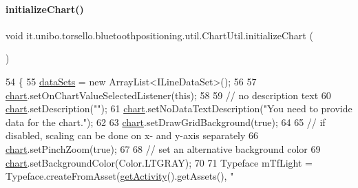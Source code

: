 \paragraph{\texorpdfstring{initialize\+Chart()}{initializeChart()}}
{\footnotesize\ttfamily void it.\+unibo.\+torsello.\+bluetoothpositioning.\+util.\+Chart\+Util.\+initialize\+Chart (\begin{DoxyParamCaption}{ }\end{DoxyParamCaption})}


\begin{DoxyCode}
54                                   \{
55         \hyperlink{classit_1_1unibo_1_1torsello_1_1bluetoothpositioning_1_1util_1_1ChartUtil_aa98bcaa2d5ba444b91cdc029768d380a_aa98bcaa2d5ba444b91cdc029768d380a}{dataSets} = \textcolor{keyword}{new} ArrayList<ILineDataSet>();
56 
57         \hyperlink{classit_1_1unibo_1_1torsello_1_1bluetoothpositioning_1_1util_1_1ChartUtil_a6c34176fdfb85bac1d3aa1529b49ad5f_a6c34176fdfb85bac1d3aa1529b49ad5f}{chart}.setOnChartValueSelectedListener(\textcolor{keyword}{this});
58 
59         \textcolor{comment}{// no description text}
60         \hyperlink{classit_1_1unibo_1_1torsello_1_1bluetoothpositioning_1_1util_1_1ChartUtil_a6c34176fdfb85bac1d3aa1529b49ad5f_a6c34176fdfb85bac1d3aa1529b49ad5f}{chart}.setDescription(\textcolor{stringliteral}{""});
61         \hyperlink{classit_1_1unibo_1_1torsello_1_1bluetoothpositioning_1_1util_1_1ChartUtil_a6c34176fdfb85bac1d3aa1529b49ad5f_a6c34176fdfb85bac1d3aa1529b49ad5f}{chart}.setNoDataTextDescription(\textcolor{stringliteral}{"You need to provide data for the chart."});
62 
63         \hyperlink{classit_1_1unibo_1_1torsello_1_1bluetoothpositioning_1_1util_1_1ChartUtil_a6c34176fdfb85bac1d3aa1529b49ad5f_a6c34176fdfb85bac1d3aa1529b49ad5f}{chart}.setDrawGridBackground(\textcolor{keyword}{true});
64 
65         \textcolor{comment}{// if disabled, scaling can be done on x- and y-axis separately}
66         \hyperlink{classit_1_1unibo_1_1torsello_1_1bluetoothpositioning_1_1util_1_1ChartUtil_a6c34176fdfb85bac1d3aa1529b49ad5f_a6c34176fdfb85bac1d3aa1529b49ad5f}{chart}.setPinchZoom(\textcolor{keyword}{true});
67 
68         \textcolor{comment}{// set an alternative background color}
69         \hyperlink{classit_1_1unibo_1_1torsello_1_1bluetoothpositioning_1_1util_1_1ChartUtil_a6c34176fdfb85bac1d3aa1529b49ad5f_a6c34176fdfb85bac1d3aa1529b49ad5f}{chart}.setBackgroundColor(Color.LTGRAY);
70 
71         Typeface mTfLight = Typeface.createFromAsset(\hyperlink{classit_1_1unibo_1_1torsello_1_1bluetoothpositioning_1_1util_1_1ChartUtil_a59150a6d20b6d0ad2fcf8c1ba858d355_a59150a6d20b6d0ad2fcf8c1ba858d355}{getActivity}().getAssets(), \textcolor{stringliteral}{"
}
\end{DoxyCode}

